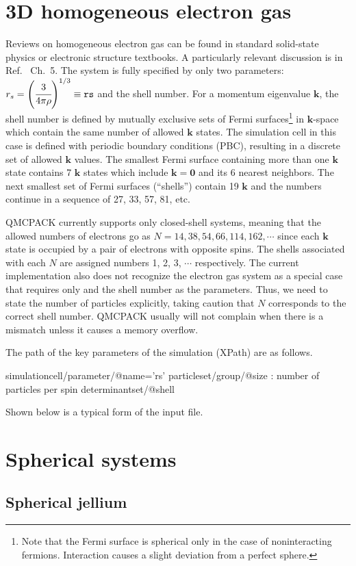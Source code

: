 \section{3D homogeneous electron gas}
Reviews on homogeneous electron gas can be found in standard solid-state physics or electronic structure textbooks.  A particularly relevant discussion is in Ref.~ Ch.~5.  The system is fully specified by only two parameters: $r_s = \left( \cfrac{3}{4 \pi \rho} \right)^{1/3} \equiv \mathtt{rs}$ and the shell number.  For a momentum eigenvalue $\mathbf{k}$, the shell number is defined by mutually exclusive sets of Fermi surfaces\footnote{Note that the Fermi surface is spherical only in the case of noninteracting fermions.  Interaction causes a slight deviation from a perfect sphere.} in $\mathbf{k}$-space which contain the same number of allowed $\mathbf{k}$ states.  The simulation cell in this case is defined with periodic boundary conditions (PBC), resulting in a discrete set of allowed $\mathbf{k}$ values.  The smallest Fermi surface containing more than one $\mathbf{k}$ state contains 7 $\mathbf{k}$ states which include $\mathbf{k} = \mathbf{0}$ and its 6 nearest neighbors.  The next smallest set of Fermi surfaces (``shells'') contain 19 $\mathbf{k}$ and the numbers continue in a sequence of 27, 33, 57, 81, etc.

QMCPACK currently supports only closed-shell systems, meaning that the allowed numbers of electrons go as $N = 14, 38, 54, 66, 114, 162, \cdots$ since each $\mathbf{k}$ state is occupied by a pair of electrons with opposite spins.  The shells associated with each $N$ are assigned numbers 1, 2, 3, $\cdots$ respectively.  The current implementation also does not recognize the electron gas system as a special case that requires only  and the shell number as the parameters.  Thus, we need to state the number of particles explicitly, taking caution that $N$ corresponds to the correct shell number.  QMCPACK usually will not complain when there is a mismatch unless it causes a memory overflow.

The path of the key parameters of the simulation (XPath) are as follows.
\begin{code}
simulationcell/parameter/@name='rs'
particleset/group/@size : number of particles per spin
determinantset/@shell
\end{code}

Shown below is a typical form of the input file.
\section{Spherical systems}
\subsection{Spherical jellium}
%
